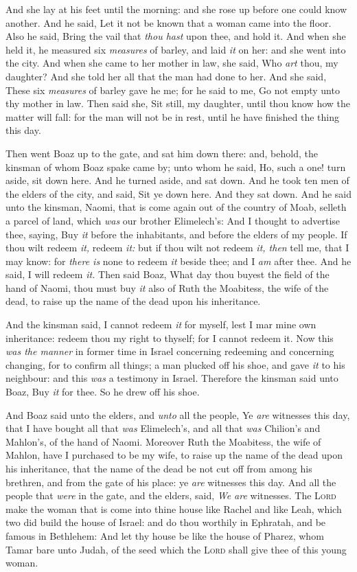 \documentclass[11pt,letterpaper,oneside]{memoir}
\begin{document}
And she lay at his feet until the morning: and she rose up before one 
could know another. And he said, Let it not be known that a woman came 
into the floor. Also he said, Bring the vail that \emph{thou hast} upon 
thee, and hold it. And when she held it, he measured six \emph{measures} 
of barley, and laid \emph{it} on her: and she went into the city. And 
when she came to her mother in law, she said, Who \emph{art} thou, my 
daughter? And she told her all that the man had done to her. And she 
said, These six \emph{measures} of barley gave he me; for he said to me, 
Go not empty unto thy mother in law. Then said she, Sit still, my 
daughter, until thou know how the matter will fall: for the man will not 
be in rest, until he have finished the thing this day. 

Then went Boaz up to the gate, and sat him down there: and, behold, the 
kinsman of whom Boaz spake came by; unto whom he said, Ho, such a one! 
turn aside, sit down here. And he turned aside, and sat down. And he 
took ten men of the elders of the city, and said, Sit ye down here. And 
they sat down. And he said unto the kinsman, Naomi, that is come again 
out of the country of Moab, selleth a parcel of land, which \emph{was} 
our brother Elimelech's: And I thought to advertise thee, saying, Buy 
\emph{it} before the inhabitants, and before the elders of my people. If 
thou wilt redeem \emph{it,} redeem \emph{it:} but if thou wilt not 
redeem \emph{it, then} tell me, that I may know: for \emph{there is} 
none to redeem \emph{it} beside thee; and I \emph{am} after thee. And he 
said, I will redeem \emph{it. }Then said Boaz, What day thou buyest the 
field of the hand of Naomi, thou must buy \emph{it} also of Ruth the 
Moabitess, the wife of the dead, to raise up the name of the dead upon 
his inheritance. 

And the kinsman said, I cannot redeem \emph{it} for myself, lest I mar 
mine own inheritance: redeem thou my right to thyself; for I cannot 
redeem it. Now this \emph{was the manner} in former time in Israel 
concerning redeeming and concerning changing, for to confirm all things; 
a man plucked off his shoe, and gave \emph{it} to his neighbour: and 
this \emph{was} a testimony in Israel. Therefore the kinsman said unto 
Boaz, Buy \emph{it} for thee. So he drew off his shoe. 

And Boaz said unto the elders, and \emph{unto} all the people, Ye 
\emph{are} witnesses this day, that I have bought all that \emph{was} 
Elimelech's, and all that \emph{was} Chilion's and Mahlon's, of the hand 
of Naomi. Moreover Ruth the Moabitess, the wife of Mahlon, have I 
purchased to be my wife, to raise up the name of the dead upon his 
inheritance, that the name of the dead be not cut off from among his 
brethren, and from the gate of his place: ye \emph{are} witnesses this 
day. And all the people that \emph{were} in the gate, and the elders, 
said, \emph{We are} witnesses. The \textsc{Lord} make the woman that is 
come into thine house like Rachel and like Leah, which two did build the 
house of Israel: and do thou worthily in Ephratah, and be famous in 
Bethlehem: And let thy house be like the house of Pharez, whom Tamar 
bare unto Judah, of the seed which the \textsc{Lord} shall give thee of 
this young woman. 
\end{document}
